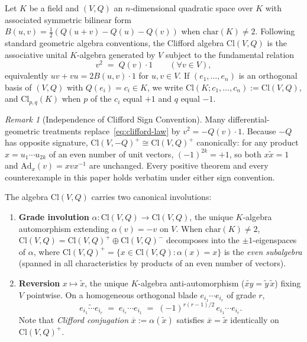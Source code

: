 \documentclass[11pt]{article}
\theoremstyle{definition}
\theoremstyle{remark}
\newtheorem{remark}[theorem]{Remark}
\newcommand{\Cl}{\mathrm{Cl}}
\newcommand{\Ad}{\mathrm{Ad}}
\begin{document}
Let $K$ be a field and $(V,Q)$ an $n$-dimensional quadratic space over $K$ with associated symmetric bilinear form $B(u,v) = \frac{1}{2}(Q(u+v) - Q(u) - Q(v))$ when $\mathrm{char}(K) \ne 2$. Following standard geometric algebra conventions, the Clifford algebra $\Cl(V,Q)$ is the associative unital $K$-algebra generated by $V$ subject to the fundamental relation
\begin{equation}\label{eq:clifford-law}
v^2 \;=\; Q(v) \cdot 1 \qquad (\forall v \in V),
\end{equation}
equivalently $u v + v u = 2 B(u,v) \cdot 1$ for $u,v \in V$. If $(e_1, \dots, e_n)$ is an orthogonal basis of $(V,Q)$ with $Q(e_i) = c_i \in K$, we write $\Cl(K; c_1, \dots, c_n) := \Cl(V,Q)$, and $\Cl_{p,q}(K)$ when $p$ of the $c_i$ equal $+1$ and $q$ equal $-1$.

\begin{remark}[Independence of Clifford Sign Convention]
Many differential-geometric treatments replace~\eqref{eq:clifford-law} by $v^2 = -Q(v) \cdot 1$. Because $-Q$ has opposite signature, $\Cl(V,-Q)^+ \cong \Cl(V,Q)^+$ canonically: for any product $x = u_1 \cdots u_{2k}$ of an even number of unit vectors, $(-1)^{2k} = +1$, so both $x \widetilde{x} = 1$ and $\Ad_x(v) = x v x^{-1}$ are unchanged. Every positive theorem and every counterexample in this paper holds verbatim under either sign convention.
\end{remark}

The algebra $\Cl(V,Q)$ carries two canonical involutions:
\begin{enumerate}
\item[(1)] \textbf{Grade involution} $\alpha : \Cl(V,Q) \to \Cl(V,Q)$, the unique $K$-algebra automorphism extending $\alpha(v) = -v$ on $V$. When $\mathrm{char}(K) \ne 2$, $\Cl(V,Q) = \Cl(V,Q)^+ \oplus \Cl(V,Q)^-$ decomposes into the $\pm 1$-eigenspaces of $\alpha$, where $\Cl(V,Q)^+ = \{x \in \Cl(V,Q) : \alpha(x) = x\}$ is the \emph{even subalgebra} (spanned in all characteristics by products of an even number of vectors).
\item[(2)] \textbf{Reversion} $x \mapsto \widetilde{x}$, the unique $K$-algebra anti-automorphism ($\widetilde{xy} = \widetilde{y}\,\widetilde{x}$) fixing $V$ pointwise. On a homogeneous orthogonal blade $e_{i_1} \cdots e_{i_r}$ of grade $r$,
\begin{equation}\label{eq:rev-sign}
\widetilde{e_{i_1} \cdots e_{i_r}} \;=\; e_{i_r} \cdots e_{i_1} \;=\; (-1)^{r(r-1)/2}\, e_{i_1} \cdots e_{i_r}.
\end{equation}
Note that \emph{Clifford conjugation} $\overline{x} := \alpha(\widetilde{x})$ satisfies $\overline{x} = \widetilde{x}$ identically on $\Cl(V,Q)^+$.
\end{enumerate}
\end{document}
